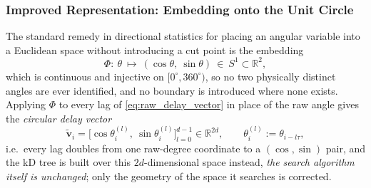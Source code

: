 \documentclass[letterpaper, 10pt, conference]{IEEEtran}
\begin{document}
    \subsubsection{Improved Representation: Embedding onto the Unit Circle} 
    \label{sssec:circular_distance}


        The standard remedy in directional statistics %
        for placing an angular variable into a Euclidean space without
        introducing a cut point is the embedding
        \begin{equation}
            \Phi:\ \theta \ \longmapsto\ (\cos\theta,\ \sin\theta)\ \in\ S^1\subset\mathbb{R}^2,
            \label{eq:unit_circle_map}
        \end{equation}
        which is continuous and injective on $[0^{\circ},360^{\circ})$, so no
        two physically distinct angles are ever identified, and no boundary
        is introduced where none exists. Applying $\Phi$ to every lag of
        \eqref{eq:raw_delay_vector} in place of the raw angle gives the
        \emph{circular delay vector}
        \begin{equation}
            \widetilde{\mathbf{v}}_i = \bigl[\cos\theta_i^{(l)},\ \sin\theta_i^{(l)}\bigr]_{l=0}^{d-1} \in \mathbb{R}^{2d},
                \qquad \theta_i^{(l)} := \theta_{i-l\tau},
            \label{eq:circular_delay_vector}
        \end{equation}
        i.e.\ every lag doubles from one raw-degree coordinate to a
        $(\cos,\sin)$ pair, and the kD tree is built over this $2d$-dimensional
        space instead, \emph{the search algorithm itself is unchanged}; only
        the geometry of the space it searches is corrected.
\end{document}
